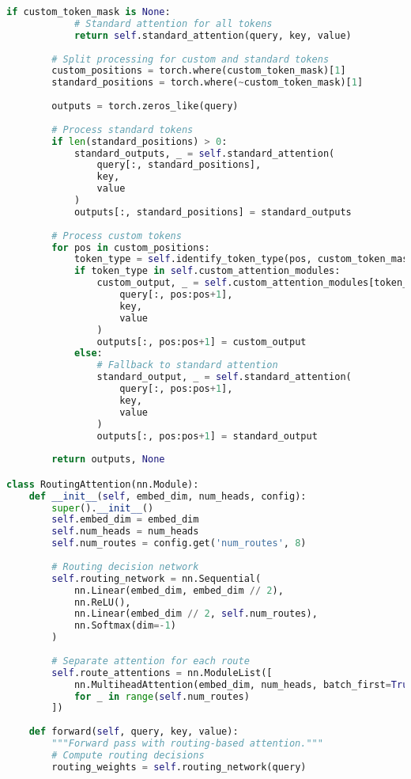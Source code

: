 \begin{lstlisting}[language=Python, caption=Custom attention mechanisms for special tokens]
        if custom_token_mask is None:
            # Standard attention for all tokens
            return self.standard_attention(query, key, value)
        
        # Split processing for custom and standard tokens
        custom_positions = torch.where(custom_token_mask)[1]
        standard_positions = torch.where(~custom_token_mask)[1]
        
        outputs = torch.zeros_like(query)
        
        # Process standard tokens
        if len(standard_positions) > 0:
            standard_outputs, _ = self.standard_attention(
                query[:, standard_positions],
                key,
                value
            )
            outputs[:, standard_positions] = standard_outputs
        
        # Process custom tokens
        for pos in custom_positions:
            token_type = self.identify_token_type(pos, custom_token_mask)
            if token_type in self.custom_attention_modules:
                custom_output, _ = self.custom_attention_modules[token_type](
                    query[:, pos:pos+1],
                    key,
                    value
                )
                outputs[:, pos:pos+1] = custom_output
            else:
                # Fallback to standard attention
                standard_output, _ = self.standard_attention(
                    query[:, pos:pos+1],
                    key,
                    value
                )
                outputs[:, pos:pos+1] = standard_output
        
        return outputs, None

class RoutingAttention(nn.Module):
    def __init__(self, embed_dim, num_heads, config):
        super().__init__()
        self.embed_dim = embed_dim
        self.num_heads = num_heads
        self.num_routes = config.get('num_routes', 8)
        
        # Routing decision network
        self.routing_network = nn.Sequential(
            nn.Linear(embed_dim, embed_dim // 2),
            nn.ReLU(),
            nn.Linear(embed_dim // 2, self.num_routes),
            nn.Softmax(dim=-1)
        )
        
        # Separate attention for each route
        self.route_attentions = nn.ModuleList([
            nn.MultiheadAttention(embed_dim, num_heads, batch_first=True)
            for _ in range(self.num_routes)
        ])
    
    def forward(self, query, key, value):
        """Forward pass with routing-based attention."""
        # Compute routing decisions
        routing_weights = self.routing_network(query)
        

\end{lstlisting}

